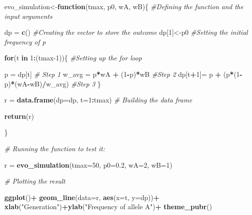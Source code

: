 \documentclass[
]{book}
\newenvironment{Shaded}{\begin{snugshade}}{\end{snugshade}}
\newcommand{\AttributeTok}[1]{\textcolor[rgb]{0.13,0.29,0.53}{#1}}
\newcommand{\CommentTok}[1]{\textcolor[rgb]{0.56,0.35,0.01}{\textit{#1}}}
\newcommand{\ControlFlowTok}[1]{\textcolor[rgb]{0.13,0.29,0.53}{\textbf{#1}}}
\newcommand{\DecValTok}[1]{\textcolor[rgb]{0.00,0.00,0.81}{#1}}
\newcommand{\FloatTok}[1]{\textcolor[rgb]{0.00,0.00,0.81}{#1}}
\newcommand{\FunctionTok}[1]{\textcolor[rgb]{0.13,0.29,0.53}{\textbf{#1}}}
\newcommand{\NormalTok}[1]{#1}
\newcommand{\OtherTok}[1]{\textcolor[rgb]{0.56,0.35,0.01}{#1}}
\newcommand{\SpecialCharTok}[1]{\textcolor[rgb]{0.81,0.36,0.00}{\textbf{#1}}}
\newcommand{\StringTok}[1]{\textcolor[rgb]{0.31,0.60,0.02}{#1}}
\begin{document}
\begin{Shaded}
\begin{Highlighting}[]
\NormalTok{evo\_simulation}\OtherTok{\textless{}{-}}\ControlFlowTok{function}\NormalTok{(tmax, p0, wA, wB)\{ }\CommentTok{\#Defining the function and the input arguments}
  
\NormalTok{  dp }\OtherTok{=} \FunctionTok{c}\NormalTok{() }\CommentTok{\#Creating the vector to store the outcome}
\NormalTok{  dp[}\DecValTok{1}\NormalTok{]}\OtherTok{\textless{}{-}}\NormalTok{p0 }\CommentTok{\#Setting the initial frequency of p}
  
  \ControlFlowTok{for}\NormalTok{(t }\ControlFlowTok{in} \DecValTok{1}\SpecialCharTok{:}\NormalTok{(tmax}\DecValTok{{-}1}\NormalTok{))\{ }\CommentTok{\#Setting up the for loop}
  
\NormalTok{  p }\OtherTok{=}\NormalTok{ dp[t] }\CommentTok{\# Step 1}
\NormalTok{  w\_avg }\OtherTok{=}\NormalTok{ p}\SpecialCharTok{*}\NormalTok{wA }\SpecialCharTok{+}\NormalTok{ (}\DecValTok{1}\SpecialCharTok{{-}}\NormalTok{p)}\SpecialCharTok{*}\NormalTok{wB }\CommentTok{\#Step 2}
\NormalTok{  dp[t}\SpecialCharTok{+}\DecValTok{1}\NormalTok{]}\OtherTok{=}\NormalTok{ p }\SpecialCharTok{+}\NormalTok{ (p}\SpecialCharTok{*}\NormalTok{(}\DecValTok{1}\SpecialCharTok{{-}}\NormalTok{p)}\SpecialCharTok{*}\NormalTok{(wA}\SpecialCharTok{{-}}\NormalTok{wB)}\SpecialCharTok{/}\NormalTok{w\_avg) }\CommentTok{\#Step 3}
\NormalTok{\}}
  
\NormalTok{  r }\OtherTok{=} \FunctionTok{data.frame}\NormalTok{(}\AttributeTok{dp=}\NormalTok{dp, }\AttributeTok{t=}\DecValTok{1}\SpecialCharTok{:}\NormalTok{tmax) }\CommentTok{\# Building the data frame}
  
  \FunctionTok{return}\NormalTok{(r)}
  
\NormalTok{\}}

\CommentTok{\# Running the function to test it:}

\NormalTok{r }\OtherTok{=} \FunctionTok{evo\_simulation}\NormalTok{(}\AttributeTok{tmax=}\DecValTok{50}\NormalTok{, }\AttributeTok{p0=}\FloatTok{0.2}\NormalTok{, }\AttributeTok{wA=}\DecValTok{2}\NormalTok{, }\AttributeTok{wB=}\DecValTok{1}\NormalTok{)}

\CommentTok{\# Plotting the result}

\FunctionTok{ggplot}\NormalTok{()}\SpecialCharTok{+}
  \FunctionTok{geom\_line}\NormalTok{(}\AttributeTok{data=}\NormalTok{r, }\FunctionTok{aes}\NormalTok{(}\AttributeTok{x=}\NormalTok{t, }\AttributeTok{y=}\NormalTok{dp))}\SpecialCharTok{+}
  \FunctionTok{xlab}\NormalTok{(}\StringTok{"Generation"}\NormalTok{)}\SpecialCharTok{+}\FunctionTok{ylab}\NormalTok{(}\StringTok{"Frequency of allele A"}\NormalTok{)}\SpecialCharTok{+}
  \FunctionTok{theme\_pubr}\NormalTok{()}
\end{Highlighting}
\end{Shaded}
\end{document}
